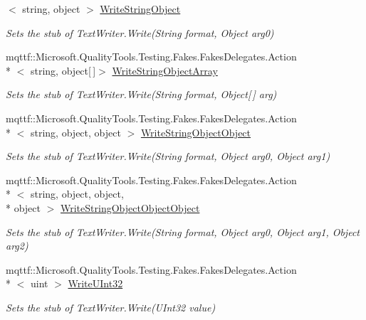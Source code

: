 \begin{DoxyCompactItemize}
$<$ string, object $>$ \hyperlink{class_system_1_1_i_o_1_1_fakes_1_1_stub_string_writer_af7632de0423468eb1e694fe6a68fd208}{Write\-String\-Object}
\begin{DoxyCompactList}\small\item\em Sets the stub of Text\-Writer.\-Write(\-String format, Object arg0)\end{DoxyCompactList}\item 
mqttf\-::\-Microsoft.\-Quality\-Tools.\-Testing.\-Fakes.\-Fakes\-Delegates.\-Action\\*
$<$ string, object\mbox{[}$\,$\mbox{]}$>$ \hyperlink{class_system_1_1_i_o_1_1_fakes_1_1_stub_string_writer_a26c9802cc912602702fa5b613ee8a327}{Write\-String\-Object\-Array}
\begin{DoxyCompactList}\small\item\em Sets the stub of Text\-Writer.\-Write(\-String format, Object\mbox{[}$\,$\mbox{]} arg)\end{DoxyCompactList}\item 
mqttf\-::\-Microsoft.\-Quality\-Tools.\-Testing.\-Fakes.\-Fakes\-Delegates.\-Action\\*
$<$ string, object, object $>$ \hyperlink{class_system_1_1_i_o_1_1_fakes_1_1_stub_string_writer_a1f4efb1d0a9b57d1f812b3aa52e97f54}{Write\-String\-Object\-Object}
\begin{DoxyCompactList}\small\item\em Sets the stub of Text\-Writer.\-Write(\-String format, Object arg0, Object arg1)\end{DoxyCompactList}\item 
mqttf\-::\-Microsoft.\-Quality\-Tools.\-Testing.\-Fakes.\-Fakes\-Delegates.\-Action\\*
$<$ string, object, object, \\*
object $>$ \hyperlink{class_system_1_1_i_o_1_1_fakes_1_1_stub_string_writer_ab18d000d58e83ca9945c12dfc40b1634}{Write\-String\-Object\-Object\-Object}
\begin{DoxyCompactList}\small\item\em Sets the stub of Text\-Writer.\-Write(\-String format, Object arg0, Object arg1, Object arg2)\end{DoxyCompactList}\item 
mqttf\-::\-Microsoft.\-Quality\-Tools.\-Testing.\-Fakes.\-Fakes\-Delegates.\-Action\\*
$<$ uint $>$ \hyperlink{class_system_1_1_i_o_1_1_fakes_1_1_stub_string_writer_a396b34fc833c83ff2a1d8e68a0387a6f}{Write\-U\-Int32}
\begin{DoxyCompactList}\small\item\em Sets the stub of Text\-Writer.\-Write(\-U\-Int32 value)\end{DoxyCompactList}\item 

\end{DoxyCompactItemize}
